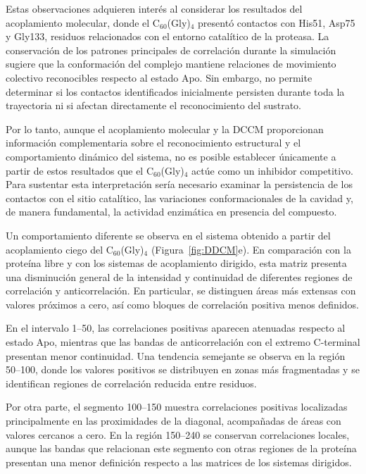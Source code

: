Estas observaciones adquieren interés al considerar los resultados del acoplamiento molecular, donde el C$_{60}$(Gly)$_4$ presentó contactos con His51, Asp75 y Gly133, residuos relacionados con el entorno catalítico de la proteasa. La conservación de los patrones principales de correlación durante la simulación sugiere que la conformación del complejo mantiene relaciones de movimiento colectivo reconocibles respecto al estado Apo. Sin embargo, no permite determinar si los contactos identificados inicialmente persisten durante toda la trayectoria ni si afectan directamente el reconocimiento del sustrato.

Por lo tanto, aunque el acoplamiento molecular y la DCCM proporcionan información complementaria sobre el reconocimiento estructural y el comportamiento dinámico del sistema, no es posible establecer únicamente a partir de estos resultados que el C$_{60}$(Gly)$_4$ actúe como un inhibidor competitivo. Para sustentar esta interpretación sería necesario examinar la persistencia de los contactos con el sitio catalítico, las variaciones conformacionales de la cavidad y, de manera fundamental, la actividad enzimática en presencia del compuesto.

Un comportamiento diferente se observa en el sistema obtenido a partir del acoplamiento ciego del C$_{60}$(Gly)$_4$ (Figura~\ref{fig:DDCM}e). En comparación con la proteína libre y con los sistemas de acoplamiento dirigido, esta matriz presenta una disminución general de la intensidad y continuidad de diferentes regiones de correlación y anticorrelación. En particular, se distinguen áreas más extensas con valores próximos a cero, así como bloques de correlación positiva menos definidos.

En el intervalo 1--50, las correlaciones positivas aparecen atenuadas respecto al estado Apo, mientras que las bandas de anticorrelación con el extremo C-terminal presentan menor continuidad. Una tendencia semejante se observa en la región 50--100, donde los valores positivos se distribuyen en zonas más fragmentadas y se identifican regiones de correlación reducida entre residuos.

Por otra parte, el segmento 100--150 muestra correlaciones positivas localizadas principalmente en las proximidades de la diagonal, acompañadas de áreas con valores cercanos a cero. En la región 150--240 se conservan correlaciones locales, aunque las bandas que relacionan este segmento con otras regiones de la proteína presentan una menor definición respecto a las matrices de los sistemas dirigidos.

